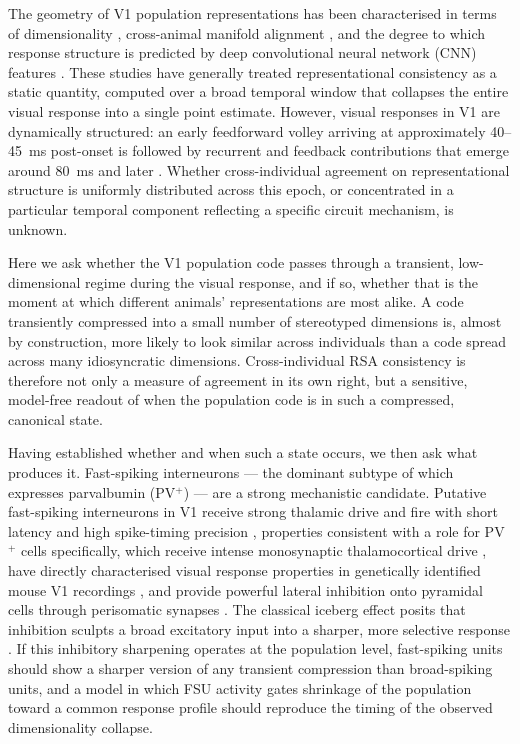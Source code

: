 \documentclass[11pt,onecolumn]{article}
\begin{document}
The geometry of V1 population representations has been characterised in
terms of dimensionality \citep{stringer2019}, cross-animal manifold
alignment \citep{williams2021}, and the degree to which response structure
is predicted by deep convolutional neural network (CNN) features
\citep{yamins2016,cadena2019}. These studies have generally treated
representational consistency as a static quantity, computed over a broad
temporal window that collapses the entire visual response into a single
point estimate. However, visual responses in V1 are dynamically structured:
an early feedforward volley arriving at approximately 40--45~ms post-onset
is followed by recurrent and feedback contributions that emerge around
80~ms and later \citep{lamme2000,kirchberger2023}. Whether cross-individual
agreement on representational structure is uniformly distributed across
this epoch, or concentrated in a particular temporal component reflecting
a specific circuit mechanism, is unknown.

Here we ask whether the V1 population code passes through a transient,
low-dimensional regime during the visual response, and if so, whether that
is the moment at which different animals' representations are most alike.
A code transiently compressed into a small number of stereotyped dimensions
is, almost by construction, more likely to look similar across individuals
than a code spread across many idiosyncratic dimensions. Cross-individual
RSA consistency is therefore not only a measure of agreement in its own
right, but a sensitive, model-free readout of when the population code is
in such a compressed, canonical state.

Having established whether and when such a state occurs, we then ask what
produces it. Fast-spiking interneurons --- the dominant subtype of which
expresses parvalbumin (PV$^+$) --- are a strong mechanistic candidate.
Putative fast-spiking interneurons in V1 receive strong thalamic drive and
fire with short latency and high spike-timing precision
\citep{zhuang2013,bereshpolova2020}, properties consistent with a role for
PV$^+$ cells specifically, which receive intense monosynaptic
thalamocortical drive \citep{cruikshank2007}, have directly characterised
visual response properties in genetically identified mouse V1 recordings
\citep{runyan2010}, and provide powerful lateral inhibition onto pyramidal
cells through perisomatic synapses \citep{freund2007}. The classical
iceberg effect posits that inhibition sculpts a broad excitatory input into
a sharper, more selective response \citep{shapiro2022, troyer1998}. If
this inhibitory sharpening operates at the population level, fast-spiking
units should show a sharper version of any transient compression than
broad-spiking units, and a model in which FSU activity gates shrinkage of
the population toward a common response profile should reproduce the
timing of the observed dimensionality collapse.
\end{document}
